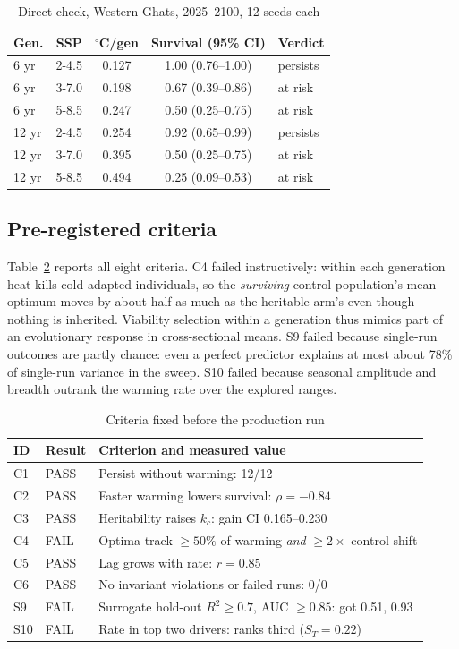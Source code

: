 \documentclass[conference]{IEEEtran}
\begin{document}
\begin{table}[t]
\caption{Direct check, Western Ghats, 2025--2100, 12 seeds each}
\label{tab:direct}
\centering
\setlength{\tabcolsep}{4pt}
\begin{tabular}{lcccl}
\toprule
Gen. & SSP & $^{\circ}$C/gen & Survival (95\% CI) & Verdict\\
\midrule
6 yr & 2-4.5 & 0.127 & 1.00 (0.76--1.00) & persists\\
6 yr & 3-7.0 & 0.198 & 0.67 (0.39--0.86) & at risk\\
6 yr & 5-8.5 & 0.247 & 0.50 (0.25--0.75) & at risk\\
12 yr & 2-4.5 & 0.254 & 0.92 (0.65--0.99) & persists\\
12 yr & 3-7.0 & 0.395 & 0.50 (0.25--0.75) & at risk\\
12 yr & 5-8.5 & 0.494 & 0.25 (0.09--0.53) & at risk\\
\bottomrule
\end{tabular}
\end{table}

\subsection{Pre-registered criteria}
Table~\ref{tab:crit} reports all eight criteria. C4 failed instructively: within
each generation heat kills cold-adapted individuals, so the \emph{surviving}
control population's mean optimum moves by about half as much as the heritable
arm's even though nothing is inherited. Viability selection within a generation
thus mimics part of an evolutionary response in cross-sectional means. S9 failed
because single-run outcomes are partly chance: even a perfect predictor explains at
most about 78\% of single-run variance in the sweep. S10 failed because seasonal
amplitude and breadth outrank the warming rate over the explored ranges.

\begin{table}[t]
\caption{Criteria fixed before the production run}
\label{tab:crit}
\centering
\setlength{\tabcolsep}{3pt}
\begin{tabular}{llp{3.6cm}}
\toprule
ID & Result & Criterion and measured value\\
\midrule
C1 & PASS & Persist without warming: 12/12\\
C2 & PASS & Faster warming lowers survival: $\rho=-0.84$\\
C3 & PASS & Heritability raises $k_c$: gain CI 0.165--0.230\\
C4 & FAIL & Optima track $\ge50\%$ of warming \emph{and} $\ge2\times$ control shift\\
C5 & PASS & Lag grows with rate: $r=0.85$\\
C6 & PASS & No invariant violations or failed runs: 0/0\\
S9 & FAIL & Surrogate hold-out $R^2\ge0.7$, AUC $\ge0.85$: got 0.51, 0.93\\
S10 & FAIL & Rate in top two drivers: ranks third ($S_T=0.22$)\\
\bottomrule
\end{tabular}
\end{table}
\end{document}
